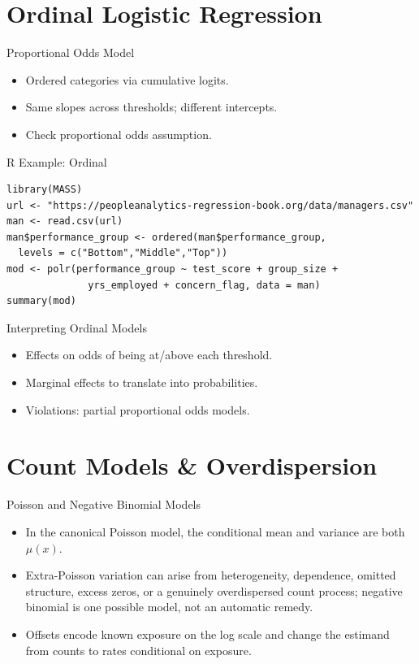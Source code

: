 \documentclass[aspectratio=169]{beamer}
\begin{document}
\section{Ordinal Logistic Regression}

\begin{frame}{Proportional Odds Model}
\begin{itemize}
  \item Ordered categories via cumulative logits.
  \item Same slopes across thresholds; different intercepts.
  \item Check proportional odds assumption.
\end{itemize}
\end{frame}

\begin{frame}[fragile]{R Example: Ordinal}
\begin{lstlisting}[style=rcode]
library(MASS)
url <- "https://peopleanalytics-regression-book.org/data/managers.csv"
man <- read.csv(url)
man$performance_group <- ordered(man$performance_group,
  levels = c("Bottom","Middle","Top"))
mod <- polr(performance_group ~ test_score + group_size +
              yrs_employed + concern_flag, data = man)
summary(mod)
\end{lstlisting}
\end{frame}

\begin{frame}{Interpreting Ordinal Models}
\begin{itemize}
  \item Effects on odds of being at/above each threshold.
  \item Marginal effects to translate into probabilities.
  \item Violations: partial proportional odds models.
\end{itemize}
\end{frame}

\section{Count Models \& Overdispersion}

\begin{frame}{Poisson and Negative Binomial Models}
\begin{itemize}
  \item In the canonical Poisson model, the conditional mean and variance are both $\mu(x)$.
  \item Extra-Poisson variation can arise from heterogeneity, dependence, omitted structure, excess zeros, or a genuinely overdispersed count process; negative binomial is one possible model, not an automatic remedy.
  \item Offsets encode known exposure on the log scale and change the estimand from counts to rates conditional on exposure.
\end{itemize}
\end{frame}
\end{document}
